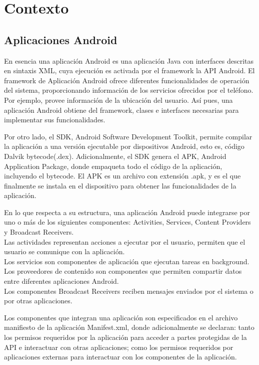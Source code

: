 \section{Contexto}
\subsection{Aplicaciones Android}
En esencia una aplicación Android es una aplicación Java con interfaces
descritas en sintaxis XML, cuya ejecución es activada por el framework la API
Android.\newline 
El framework de Aplicación Android ofrece diferentes funcionalidades de
operación del sistema, proporcionando información de los servicios ofrecidos por
el teléfono. Por ejemplo, provee información de la ubicación del
usuario.\newline 
Así pues, una aplicación Android obtiene del framework, clases e interfaces
necesarias para implementar sus funcionalidades.

Por otro lado, el SDK, Android Software Development Toolkit, permite compilar
la aplicación a una versión ejecutable por dispositivos Android, esto es, código
Dalvik bytecode(.dex). Adicionalmente, el SDK genera el APK, Android Application
Package, donde empaqueta todo el código de la aplicación, incluyendo el
bytecode. El APK es un archivo con extensión .apk, y es el que finalmente se
instala en el dispositivo para obtener las funcionalidades de la aplicación.

En lo que respecta a su estructura, 
una aplicación Android puede integrarse por uno o más de los siguientes
componentes: Activities, Services, Content Providers y Broadcast Receivers.\\
Las actividades representan acciones a ejecutar por el usuario, permiten que el
usuario se comunique con la aplicación.\\
Los servicios son componentes de aplicación que ejecutan tareas en background.\\
Los proveedores de contenido son componentes que permiten compartir datos entre
diferentes aplicaciones Android.\\
Los componentes Broadcast Receivers reciben mensajes enviados por el sistema o
por otras aplicaciones.

Los componentes que integran una aplicación son especificados en el archivo
manifiesto de la aplicación Manifest.xml\cite{App-Manifest}, donde
adicionalmente se declaran: tanto los permisos requeridos por la aplicación para
acceder a partes protegidas de la API\cite{Android-Permissions} e interactuar
con otras aplicaciones; como los permisos requeridos por aplicaciones
externas para interactuar con los componentes de la aplicación.


